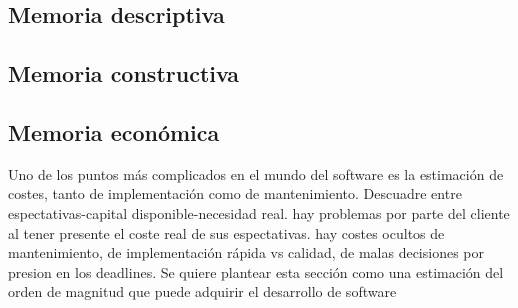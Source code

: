 \subsection{Memoria descriptiva}\label{subsec:memoria-descriptiva}
	
\subsection{Memoria constructiva}\label{subsec:memoria-constructiva}
	
\subsection{Memoria económica}\label{subsec:memoria-economica}
Uno de los puntos más complicados en el mundo del software es la estimación de costes, tanto de implementación como de mantenimiento. Descuadre entre espectativas-capital disponible-necesidad real. hay problemas por parte del cliente al tener presente el coste real de sus espectativas. hay costes ocultos de mantenimiento, de implementación rápida vs calidad, de malas decisiones por presion en los deadlines. Se quiere plantear esta sección como una estimación del orden de magnitud que puede adquirir el desarrollo de software